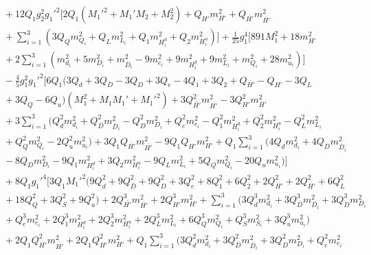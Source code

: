 \documentclass[preprint,amsmath,amssymb,aps,superscriptaddress,prd,
showpacs,floatfix,nofootinbib]{revtex4-1}
\begin{document}
\begin{subequations}
\begin{align}
& {} + 12 Q_1 g_2^2 g_1'^2 \bigg [ 2 Q_1 \left ( M_1'^2 + M_1' M_2 + M_2^2
\right ) + Q_{H'} m_{H'}^2 + Q_{\overline{H'}} m_{\overline{H'}}^2 \nonumber \\
& {} + \sum_{i=1}^3 \left ( 3 Q_Q m_{Q_i}^2 + Q_L m_{L_i}^2 + Q_1 m_{H_i^d}^2
+ Q_2 m_{H_i^u}^2 \right ) \bigg ] + \frac{1}{25} g_1^4 \bigg [ 891 M_1^2 +
18 m_{H'}^2 \nonumber \\
& {} + 2 \sum_{i=1}^3 \left ( m_{d_i}^2 + 5 m_{D_i}^2 + m_{\overline{D}_i}^2
- 9 m_{e_i}^2 + 9 m_{H_i^d}^2 + 9 m_{L_i}^2 + m_{Q_i}^2 + 28 m_{u_i}^2
\right ) \bigg ] \nonumber \\
& {} - \frac{4}{5} g_1^2 g_1'^2 \bigg [ 6 Q_1 \big ( 3 Q_d +
3 Q_{\overline{D}} - 3 Q_D + 3 Q_e - 4 Q_1 + 3 Q_2 + Q_{\overline{H'}} -
Q_{H'} - 3 Q_L \nonumber \\
& {} + 3 Q_Q - 6 Q_u \big ) \left ( M_1^2 + M_1 M_1' + M_1'^2 \right ) +
3 Q_{\overline{H'}}^2 m_{\overline{H'}}^2 - 3 Q_{H'}^2 m_{H'}^2 \nonumber \\
& {} + 3 \sum_{i=1}^3 \big ( Q_d^2 m_{d_i}^2 +
Q_{\overline{D}}^2 m_{\overline{D}_i}^2 - Q_D^2 m_{D_i}^2 + Q_e^2 m_{e_i}^2
- Q_1^2 m_{H_i^d}^2 + Q_2^2 m_{H_i^u}^2 - Q_L^2 m_{L_i}^2 \nonumber \\
& {} + Q_Q^2 m_{Q_i}^2 - 2 Q_u^2 m_{u_i}^2 \big ) +
3 Q_1 Q_{\overline{H'}} m_{\overline{H'}}^2 - 9 Q_1 Q_{H'} m_{H'}^2 +
Q_1 \sum_{i=1}^3 \bigg ( 4 Q_d m_{d_i}^2 +
4 Q_{\overline{D}} m_{\overline{D}_i}^2 \nonumber \\
& {} - 8 Q_D m_{D_i}^2 - 9 Q_1 m_{H_i^d}^2 + 3 Q_2 m_{H_i^u}^2 -
9 Q_L m_{L_i}^2 + 5 Q_Q m_{Q_i}^2 - 20 Q_u m_{u_i}^2 \big ) \bigg ] \nonumber \\
& {} + 8 Q_1 g_1'^4 \bigg [ 3 Q_1 M_1'^2 \big ( 9 Q_d^2 + 9 Q_{\overline{D}}^2
+ 9 Q_D^2 + 3 Q_e^2 + 8 Q_1^2 + 6 Q_2^2 + 2 Q_{\overline{H'}}^2 + 2 Q_{H'}^2
+ 6 Q_L^2 \nonumber \\
& {} + 18 Q_Q^2 + 3 Q_S^2 + 9 Q_u^2 \big ) +
2 Q_{\overline{H'}}^3 m_{\overline{H'}}^2 + 2 Q_{H'}^3 m_{H'}^2 +
\sum_{i=1}^3 \big ( 3 Q_d^3 m_{d_i}^2 +
3 Q_{\overline{D}}^3 m_{\overline{D}_i}^2 + 3 Q_D^3 m_{D_i}^2 \nonumber \\
& {} + Q_e^3 m_{e_i}^2 + 2 Q_1^3 m_{H_i^d}^2 + 2 Q_2^3 m_{H_i^u}^2 +
2 Q_L^3 m_{L_i}^2 + 6 Q_Q^3 m_{Q_i}^2 + Q_S^3 m_{S_i}^2 + 3 Q_u^3 m_{u_i}^2
\big ) \nonumber \\
& {} + 2 Q_1 Q_{\overline{H'}}^2 m_{\overline{H'}}^2 + 2 Q_1 Q_{H'}^2 m_{H'}^2
+ Q_1 \sum_{i=1}^3 \big ( 3 Q_d^2 m_{d_i}^2 +
3 Q_{\overline{D}}^2 m_{\overline{D}_i}^2 + 3 Q_D^2 m_{D_i}^2 +
Q_e^2 m_{e_i}^2 \nonumber \\

\end{align}
\end{subequations}
\end{document}
